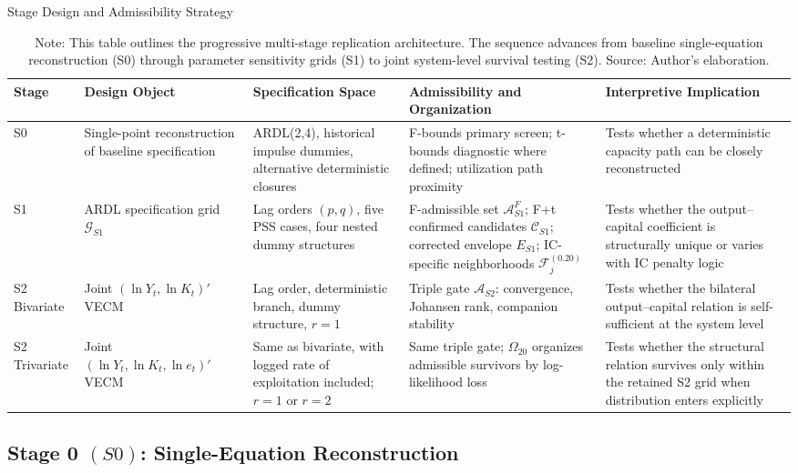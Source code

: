\documentclass[11pt]{article}
\begin{document}
\begin{table}[H]
\centering
\scriptsize
\caption{Stage Design and Admissibility Strategy}
\label{tab:stage_design_synthesis}
\begin{tabular}{@{}>{\raggedright\arraybackslash}p{1.6cm}>{\raggedright\arraybackslash}p{2.6cm}>{\raggedright\arraybackslash}p{3.0cm}>{\raggedright\arraybackslash}p{3.2cm}>{\raggedright\arraybackslash}p{3.2cm}@{}}
\toprule
Stage & Design Object & Specification Space & Admissibility and Organization & Interpretive Implication \\
\midrule
\midrule
S0 & Single-point reconstruction of baseline specification & ARDL(2,4), historical impulse dummies, alternative deterministic closures & F-bounds primary screen; t-bounds diagnostic where defined; utilization path proximity & Tests whether a deterministic capacity path can be closely reconstructed \\
S1 & ARDL specification grid $\mathcal{G}_{S1}$ & Lag orders $(p,q)$, five PSS cases, four nested dummy structures & F-admissible set $\mathcal{A}^{F}_{S1}$; F+t confirmed candidates $\mathcal{C}_{S1}$; corrected envelope $E_{S1}$; IC-specific neighborhoods $\mathcal{F}^{(0.20)}_j$ & Tests whether the output--capital coefficient is structurally unique or varies with IC penalty logic \\
S2 Bivariate & Joint $(\ln Y_t, \ln K_t)'$ VECM & Lag order, deterministic branch, dummy structure, $r=1$ & Triple gate $\mathcal{A}_{S2}$: convergence, Johansen rank, companion stability & Tests whether the bilateral output--capital relation is self-sufficient at the system level \\
S2 Trivariate & Joint $(\ln Y_t, \ln K_t, \ln e_t)'$ VECM & Same as bivariate, with logged rate of exploitation included; $r=1$ or $r=2$ & Same triple gate; $\Omega_{20}$ organizes admissible survivors by log-likelihood loss & Tests whether the structural relation survives only within the retained S2 grid when distribution enters explicitly \\
\bottomrule
\end{tabular}
\caption*{Note: This table outlines the progressive multi-stage replication architecture. The sequence advances from baseline single-equation reconstruction (S0) through parameter sensitivity grids (S1) to joint system-level survival testing (S2). Source: Author's elaboration.}
\end{table}

\subsection{Stage 0 \texorpdfstring{$(S0)$}{}: Single-Equation Reconstruction}
\label{subsec:S0_reconstruction}
\end{document}
